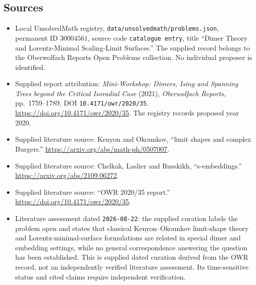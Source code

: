\documentclass[11pt]{article}
\begin{document}
\subsection{Sources}
\begin{itemize}
\item Local UnsolvedMath registry, \texttt{data/unsolvedmath/problems.json}, permanent ID \(30004561\), source code \texttt{catalogue entry}, title ``Dimer Theory and Lorentz-Minimal Scaling-Limit Surfaces.'' The supplied record belongs to the Oberwolfach Reports Open Problems collection. No individual proposer is identified.
\item Supplied report attribution: \emph{Mini-Workshop: Dimers, Ising and Spanning Trees beyond the Critical Isoradial Case} (2021), \emph{Oberwolfach Reports}, pp.~1759--1789, DOI \texttt{10.4171/owr/2020/35}. \url{https://doi.org/10.4171/owr/2020/35}. The registry records proposed year 2020.
\item Supplied literature source: Kenyon and Okounkov, ``limit shapes and complex Burgers.'' \url{https://arxiv.org/abs/math-ph/0507007}.
\item Supplied literature source: Chelkak, Laslier and Russkikh, ``s-embeddings.'' \url{https://arxiv.org/abs/2109.06272}.
\item Supplied literature source: ``OWR 2020/35 report.'' \url{https://doi.org/10.4171/owr/2020/35}.
\item Literature assessment dated \texttt{2026-08-22}: the supplied curation labels the problem open and states that classical Kenyon--Okounkov limit-shape theory and Lorentz-minimal-surface formulations are related in special dimer and embedding settings, while no general correspondence answering the question has been established. This is supplied dated curation derived from the OWR record, not an independently verified literature assessment. Its time-sensitive status and cited claims require independent verification.
\end{itemize}
\end{document}
